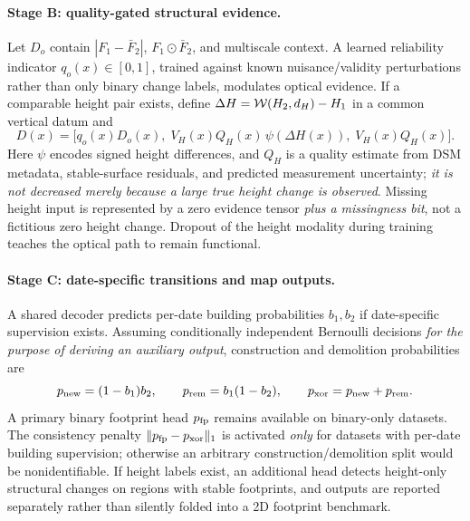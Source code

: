 \documentclass[11pt,a4paper]{article}
\begin{document}
\paragraph{Stage B: quality-gated structural evidence.} Let $D_o$ contain $|F_1-\bar F_2|$, $F_1\odot\bar F_2$, and multiscale context. A learned reliability indicator $q_o(x)\in[0,1]$, trained against known nuisance/validity perturbations rather than only binary change labels, modulates optical evidence. If a comparable height pair exists, define $\Delta H={\cal W}(H_2,d_H)-H_1$ in a common vertical datum and
\begin{equation}
 D(x)=\big[q_o(x)D_o(x),\;V_H(x)Q_H(x)\,\psi(\Delta H(x)),\;V_H(x)Q_H(x)\big].
 \label{eq:fusion}
\end{equation}
Here $\psi$ encodes signed height differences, and $Q_H$ is a quality estimate from DSM metadata, stable-surface residuals, and predicted measurement uncertainty; \emph{it is not decreased merely because a large true height change is observed}. Missing height input is represented by a zero evidence tensor \emph{plus a missingness bit}, not a fictitious zero height change. Dropout of the height modality during training teaches the optical path to remain functional.

\paragraph{Stage C: date-specific transitions and map outputs.} A shared decoder predicts per-date building probabilities $b_1,b_2$ if date-specific supervision exists. Assuming conditionally independent Bernoulli decisions \emph{for the purpose of deriving an auxiliary output}, construction and demolition probabilities are
\begin{equation}
 p_{\rm new}=(1-b_1)b_2,\qquad
 p_{\rm rem}=b_1(1-b_2),\qquad
 p_{\rm xor}=p_{\rm new}+p_{\rm rem}.
 \label{eq:transition}
\end{equation}
A primary binary footprint head $p_{\rm fp}$ remains available on binary-only datasets. The consistency penalty $\|p_{\rm fp}-p_{\rm xor}\|_1$ is activated \emph{only} for datasets with per-date building supervision; otherwise an arbitrary construction/demolition split would be nonidentifiable. If height labels exist, an additional head detects height-only structural changes on regions with stable footprints, and outputs are reported separately rather than silently folded into a 2D footprint benchmark.
\end{document}

